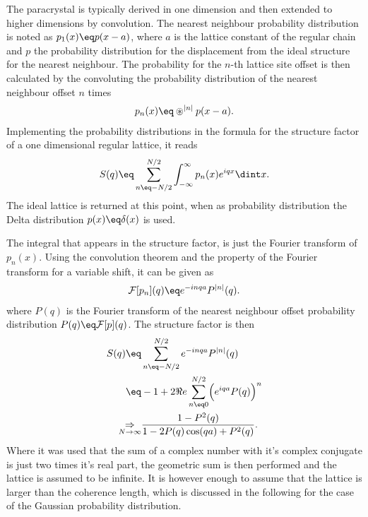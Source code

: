 \documentclass[\main/dresen_thesis.tex]{subfiles}
\begin{document}
    The paracrystal is typically derived in one dimension and then extended to higher dimensions by convolution.
    The nearest neighbour probability distribution is noted as $p_1(x) \eq p(x-a)$, where $a$ is the lattice constant of the regular chain and $p$ the probability distribution for the displacement from the ideal structure for the nearest neighbour.
    The probability for the $n$-th lattice site offset is then calculated by the convoluting the probability distribution of the nearest neighbour offset $n$ times
    \begin{align}
      p_n (x) \eq \circledast^{|n|} p(x-a).
    \end{align}
    Implementing the probability distributions in the formula for the structure factor of a one dimensional regular lattice, it reads
    \begin{align}
      S(q) \eq \sum_{n\eq -N/2}^{N/2} \int_{- \infty}^\infty p_n(x) e^{i q x} \dint x.
    \end{align}
    The ideal lattice is returned at this point, when as probability distribution the Delta distribution $p(x) \eq \delta(x)$ is used.

    The integral that appears in the structure factor, is just the Fourier transform of $p_n(x)$.
    Using the convolution theorem and the property of the Fourier transform for a variable shift, it can be given as
    \begin{align}
      \mathcal{F} [p_n](q) \eq e^{-inqa} P^{|n|}(q).
    \end{align}
    where $P(q)$ is the Fourier transform of the nearest neighbour offset probability distribution $P(q) \eq \mathcal{F} [p](q)$.
    The structure factor is then
    \begin{align}\begin{split}
      S(q) \eq& \sum_{n\eq -N/2}^{N/2} e^{-inqa} P^{|n|}(q)\\
      \eq& -1 + 2\Re e\sum_{n\eq 0}^{N/2} \Bigl(e^{iqa} P(q) \Bigr)^n\\
      \underset{N \rightarrow \infty}{\Rightarrow}& \frac{1 - P^2(q)}{1 - 2 P(q) \cos(qa) + P^2(q)}.\label{eq:appendix:calculations:paracrystal:StructureFactor}
    \end{split}\end{align}
    Where it was used that the sum of a complex number with it's complex conjugate is just two times it's real part, the geometric sum is then performed and the lattice is assumed to be infinite.
    It is however enough to assume that the lattice is larger than the coherence length, which is discussed in the following for the case of the Gaussian probability distribution.
\end{document}
